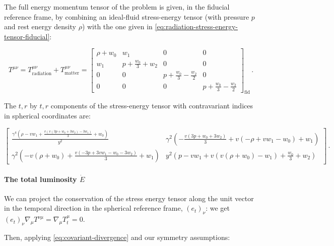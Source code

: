 \documentclass[main.tex]{subfiles}
\begin{document}
The full energy momentum tensor of the problem is given, in the fiducial reference frame, by combining an ideal-fluid stress-energy tensor (with pressure \(p\) and rest energy density \(\rho\)) with the one given in \eqref{eq:radiation-stress-energy-tensor-fiducial}:

\begin{equation}
    T^{\mu\nu} =
    T^{\mu\nu}_{\text{radiation}} +
    T^{\mu\nu}_{\text{matter}} =
    \left[\begin{matrix}\rho + w_{0} & w_{1} & 0 & 0\\w_{1} & p + \frac{w_{0}}{3} + w_{2} & 0 & 0\\0 & 0 & p + \frac{w_{0}}{3} - \frac{w_{2}}{2} & 0\\0 & 0 & 0 & p + \frac{w_{0}}{3} - \frac{w_{2}}{2}\end{matrix}\right] _{\text{fid}}\,.
\end{equation}

The \(t,r\) by \(t, r\) components of the stress-energy tensor with contravariant indices in spherical coordinates are:

\begin{equation} \label{eq:spherical-coordinates-full-stress-energy-tensor}
      \left[
      \begin{matrix}
      \frac{\gamma^{4} \left(\rho - v w_{1} + \frac{v \left(v \left(3 p + w_{0} + 3 w_{2}\right) - 3 w_{1}\right)}{3} + w_{0}\right)}{y^{2}} &
      \gamma^{2} \left(- \frac{v \left(3 p + w_{0} + 3 w_{2}\right)}{3} + v \left(- \rho + v w_{1} - w_{0}\right) + w_{1}\right)\\
      \gamma^{2} \left(- v \left(\rho + w_{0}\right) + \frac{v \left(- 3 p + 3 v w_{1} - w_{0} - 3 w_{2}\right)}{3} + w_{1}\right) &
      y^{2} \left(p - v w_{1} + v \left(v \left(\rho + w_{0}\right) - w_{1}\right) + \frac{w_{0}}{3} + w_{2}\right)
    \end{matrix}
      \right] \,.
\end{equation}

\paragraph{The total luminosity \(\dot{E}\)}

We can project the conservation of the stress energy tensor along the unit vector in the temporal direction in the spherical reference frame, \((e_t)_\nu\): we get  \((e_t)_\nu \nabla_\mu T^{\nu\mu} = \nabla_\mu T_t^\mu = 0\).

Then, applying \eqref{eq:covariant-divergence} and our symmetry assumptions:
\end{document}
